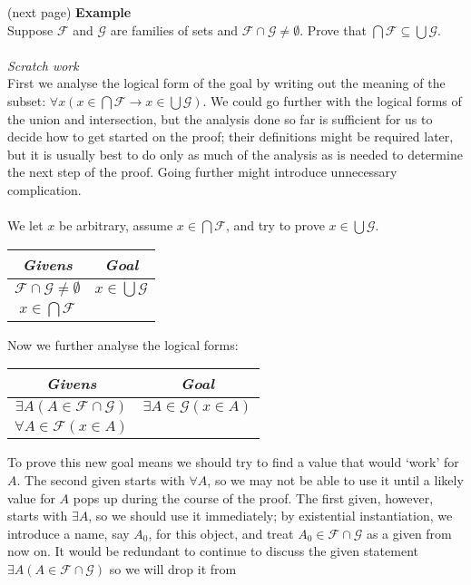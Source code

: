 \documentclass{report}
\theoremstyle{definition}
\begin{document}
(next page)\newpage
\noindent\textbf{Example}\\
Suppose $\mathcal F$ and $\mathcal G$ are families of sets and $\mathcal F\cap\mathcal G\neq\emptyset$. Prove that 
$\bigcap\mathcal F\subseteq\bigcup\mathcal G$.\\
\vspace{1mm}\\
\textit{Scratch work}\\
First we analyse the logical form of the goal by writing out the meaning of the subset: 
$\forall x(x\in\bigcap\mathcal F\to x\in\bigcup\mathcal G)$. We could go further with the logical forms of the union and 
intersection, but the analysis done so far is sufficient for us to decide how to get started on the proof; their definitions
might be required later, but it is usually best to do only as much of the analysis as is needed to determine the next step
of the proof. Going further might introduce unnecessary complication.\\
\vspace{1mm}\\
We let $x$ be arbitrary, assume $x\in\bigcap\mathcal F$, and try to prove $x\in\bigcup\mathcal G$.
\begin{center}
\begin{tabular}{c|c}
\textit{Givens}&\textit{Goal}\\
\hline
$\mathcal F\cap\mathcal G\neq\emptyset$&$x\in\bigcup\mathcal G$\\
$x\in\bigcap\mathcal F$&
\end{tabular}
\end{center}
Now we further analyse the logical forms:
\begin{center}
\begin{tabular}{c|c}
\textit{Givens}&\textit{Goal}\\
\hline
$\exists A(A\in\mathcal F\cap\mathcal G)$&$\exists A\in\mathcal G(x\in A)$\\
$\forall A\in\mathcal F(x\in A)$&
\end{tabular}
\end{center}
To prove this new goal means we should try to find a value that would `work' for $A$. The second given starts with $\forall A$, so we may not be able to use it until a likely value for $A$ pops up
during the course of the proof. The first given, however, starts with $\exists A$, so we should use it immediately; by existential instantiation, we introduce a name, say $A_0$, for this object, 
and treat $A_0\in\mathcal F\cap\mathcal G$ as a given from now on. It would be redundant to continue to discuss the given statement $\exists A(A\in\mathcal F\cap\mathcal G)$ so we will drop it from 
\end{document}
